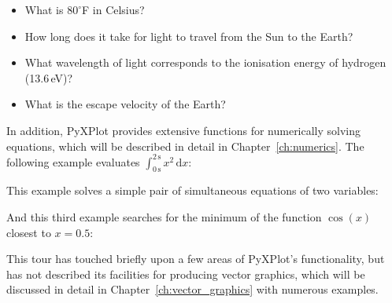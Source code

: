 \begin{itemize}
\item What is $80^\circ$F in Celsius?

\vspace{3mm}

\vspace{3mm}

\item How long does it take for light to travel from the Sun to the Earth?

\vspace{3mm}

\vspace{3mm}

\item What wavelength of light corresponds to the ionisation energy of hydrogen (13.6\,eV)?

\vspace{3mm}

\vspace{3mm}

\item What is the escape velocity of the Earth?

\vspace{3mm}

\vspace{3mm}
\end{itemize}

In addition, PyXPlot provides extensive functions for numerically solving
equations, which will be described in detail in Chapter~\ref{ch:numerics}. The
following example evaluates $\int_{0\,\mathrm{s}}^{2\,\mathrm{s}}
x^2\,\mathrm{d}x$:

\vspace{3mm}

\vspace{3mm}

\noindent This example solves a simple pair of simultaneous equations of two variables:

\vspace{3mm}

\vspace{3mm}

\noindent And this third example searches for the minimum of the function $\cos(x)$ closest to $x=0.5$:

\vspace{3mm}

\vspace{3mm}

This tour has touched briefly upon a few areas of PyXPlot's functionality, but
has not described its facilities for producing vector graphics, which will be
discussed in detail in Chapter~\ref{ch:vector_graphics} with numerous examples.

